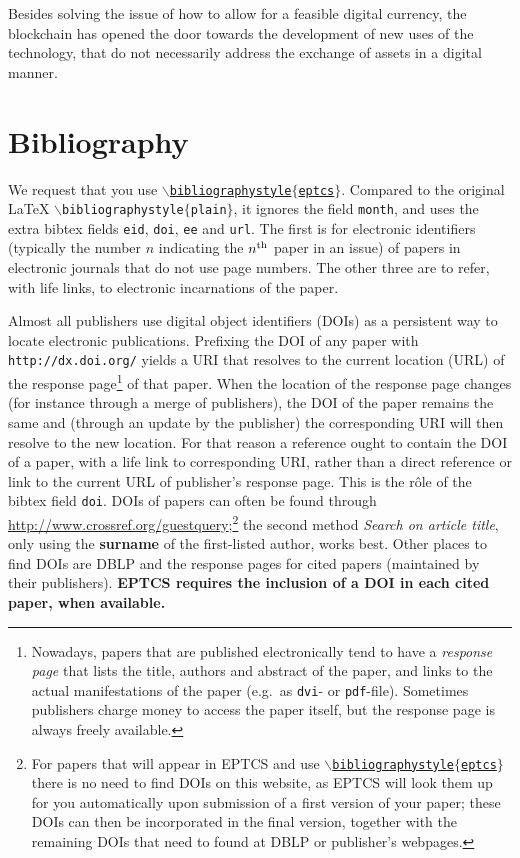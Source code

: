 \documentclass[submission,copyright,creativecommons]{eptcs}
\begin{document}
Besides solving the issue of how to allow for a feasible digital currency, the blockchain has opened the door towards the development of new uses of the technology, that do not necessarily address the exchange of assets in a digital manner.


\section{Bibliography}

We request that you use
\href{http://www.cse.unsw.edu.au/~rvg/EPTCS/eptcs.bst}
{\tt $\backslash$bibliographystyle$\{$eptcs$\}$}. Compared to the original {\LaTeX}
{\tt $\backslash$biblio\-graphystyle$\{$plain$\}$},
it ignores the field {\tt month}, and uses the extra
bibtex fields {\tt eid}, {\tt doi}, {\tt ee} and {\tt url}.
The first is for electronic identifiers (typically the number $n$
indicating the $n^{\rm th}$ paper in an issue) of papers in electronic
journals that do not use page numbers. The other three are to refer,
with life links, to electronic incarnations of the paper.

Almost all publishers use digital object identifiers (DOIs) as a
persistent way to locate electronic publications. Prefixing the DOI of
any paper with {\tt http://dx.doi.org/} yields a URI that resolves to the
current location (URL) of the response page\footnote{Nowadays, papers
  that are published electronically tend
  to have a \emph{response page} that lists the title, authors and
  abstract of the paper, and links to the actual manifestations of
  the paper (e.g.\ as {\tt dvi}- or {\tt pdf}-file). Sometimes
  publishers charge money to access the paper itself, but the response
  page is always freely available.}
of that paper. When the location of the response page changes (for
instance through a merge of publishers), the DOI of the paper remains
the same and (through an update by the publisher) the corresponding
URI will then resolve to the new location. For that reason a reference
ought to contain the DOI of a paper, with a life link to corresponding
URI, rather than a direct reference or link to the current URL of
publisher's response page. This is the r\^ole of the bibtex field {\tt doi}.
DOIs of papers can often be found through
\url{http://www.crossref.org/guestquery};\footnote{For papers that will appear
  in EPTCS and use \href{http://www.cse.unsw.edu.au/~rvg/EPTCS/eptcs.bst}
  {\tt $\backslash$bibliographystyle$\{$eptcs$\}$} there is no need to
  find DOIs on this website, as EPTCS will look them up for you
  automatically upon submission of a first version of your paper;
  these DOIs can then be incorporated in the final version, together
  with the remaining DOIs that need to found at DBLP or publisher's webpages.}
the second method {\it Search on article title}, only using the {\bf
surname} of the first-listed author, works best.  
Other places to find DOIs are DBLP and the response pages for cited
papers (maintained by their publishers).
{\bf EPTCS requires the inclusion of a DOI in each cited paper, when available.}
\end{document}
